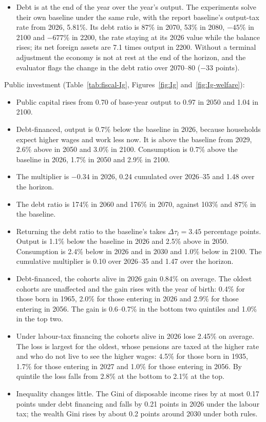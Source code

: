 \documentclass[11pt,a4paper]{article}
\begin{document}
\begin{itemize}
  capital income, the lump sum and the minimum income benefit, net of
  taxes), consumption, labour income of the employed and wealth.
\item Debt is at the end of the year over the year's output. The experiments
  solve their own baseline under the same rule, with the report baseline's
  output-tax rate from 2026, 5.81\%. Its debt ratio is 87\% in 2070, 53\%
  in 2080, $-45$\% in 2100 and $-677$\% in 2200, the rate staying at its
  2026 value while the balance rises; its net foreign assets are 7.1 times
  output in 2200. Without a terminal adjustment the economy is not at rest
  at the end of the horizon, and the evaluator flags the change in the debt
  ratio over 2070--80 ($-33$ points).
\end{itemize}

\noindent Public investment (Table~\ref{tab:fiscal-Ig}, Figures~\ref{fig:Ig}
and~\ref{fig:Ig-welfare}):
\begin{itemize}
\item Public capital rises from 0.70 of base-year output to 0.97 in 2050
  and 1.04 in 2100.
\item Debt-financed, output is 0.7\% below the baseline in 2026, because
  households expect higher wages and work less now. It is above the
  baseline from 2029, 2.6\% above in 2050 and 3.0\% in 2100. Consumption is
  0.7\% above the baseline in 2026, 1.7\% in 2050 and 2.9\% in 2100.
\item The multiplier is $-0.34$ in 2026, 0.24 cumulated over 2026--35 and
  1.48 over the horizon.
\item The debt ratio is 174\% in 2060 and 176\% in 2070, against 103\% and
  87\% in the baseline.
\item Returning the debt ratio to the baseline's takes $\Delta\tau_l=3.45$
  percentage points. Output is 1.1\% below the baseline in 2026 and 2.5\%
  above in 2050. Consumption is 2.4\% below in 2026 and in 2030 and 1.0\%
  below in 2100. The cumulative multiplier is 0.10 over 2026--35 and 1.47
  over the horizon.
\item Debt-financed, the cohorts alive in 2026 gain 0.84\% on average. The
  oldest cohorts are unaffected and the gain rises with the year of birth:
  0.4\% for those born in 1965, 2.0\% for those entering in 2026 and 2.9\%
  for those entering in 2056. The gain is 0.6--0.7\% in the bottom two
  quintiles and 1.0\% in the top two.
\item Under labour-tax financing the cohorts alive in 2026 lose 2.45\% on
  average. The loss is largest for the oldest, whose pensions are taxed at
  the higher rate and who do not live to see the higher wages: 4.5\% for
  those born in 1935, 1.7\% for those entering in 2027 and 1.0\% for those
  entering in 2056. By quintile the loss falls from 2.8\% at the bottom to
  2.1\% at the top.
\item Inequality changes little. The Gini of disposable income rises by at
  most 0.17 points under debt financing and falls by 0.21 points in 2026
  under the labour tax; the wealth Gini rises by about 0.2 points around
  2030 under both rules.
\end{itemize}
\end{document}
